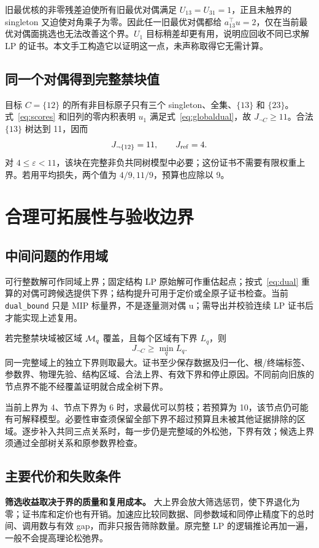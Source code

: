 旧最优核的非零残差迫使所有旧最优对偶满足 $U_{13}=U_{31}=1$，正且未触界的 singleton 又迫使对角乘子为零。因此任一旧最优对偶都给 $a_{13}^\top u=2$，仅在当前最优对偶面挑选也无法改善这个界。$U_1$ 目标稍差却更有用，说明应回收不同已求解 LP 的证书。本文手工构造它以证明这一点，未声称取得它无需计算。

\subsection{同一个对偶得到完整禁块值}
目标 $C=\{12\}$ 的所有非目标原子只有三个 singleton、全集、$\{13\}$ 和 $\{23\}$。式~\eqref{eq:scores} 和旧列的零内积表明 $u_1$ 满足式~\eqref{eq:globaldual}，故 $J_{\neg C}\ge11$。合法 $\{13\}$ 树达到 11，因而
\begin{equation}
 J_{\neg\{12\}}=11,\qquad J_{\rm ref}=4.
 \label{eq:necessityexample}
\end{equation}
对 $4\le\varepsilon<11$，该块在完整非负共同树模型中必要；这份证书不需要有限权重上界。若用平均损失，两个值为 $4/9,11/9$，预算也应除以 9。

\section{合理可拓展性与验收边界}
\label{sec:extension}
\subsection{中间问题的作用域}
可行整数解可作同域上界；固定结构 LP 原始解可作重估起点；按式~\eqref{eq:dual} 重算的对偶可跨候选提供下界；结构提升可用于定价或全原子证书检查。当前 \texttt{dual\_bound} 只是 MIP 标量界，不是逐量测对偶 u；需导出并校验连续 LP 证书后才能实现上述复用。

若完整禁块域被区域 $\mathcal M_q$ 覆盖，且每个区域有下界 $L_q$，则
\begin{equation}
 J_{\neg C}\ge\min_qL_q.
 \label{eq:coverage}
\end{equation}
同一完整域上的独立下界则取最大。证书至少保存数据及归一化、根/终端标签、参数界、物理先验、结构区域、合法上界、有效下界和停止原因。不同前向旧族的节点界不能不经覆盖证明就合成全树下界。

当前上界为 4、节点下界为 6 时，求最优可以剪枝；若预算为 10，该节点仍可能有可解释模型。必要性审查须保留全部下界不超过预算且未被其他证据排除的区域。逐步补入共同三点关系时，每一步仍是完整域的外松弛，下界有效；候选上界须通过全部树关系和原参数界检查。

\subsection{主要代价和失败条件}
\textbf{筛选收益取决于界的质量和复用成本。} 大上界会放大筛选惩罚，使下界退化为零；证书库和定价也有开销。加速应比较同数据、同参数域和同停止精度下的总时间、调用数与有效 gap，而非只报告筛除数量。原完整 LP 的逻辑推论再加一遍，一般不会提高理论松弛界。

